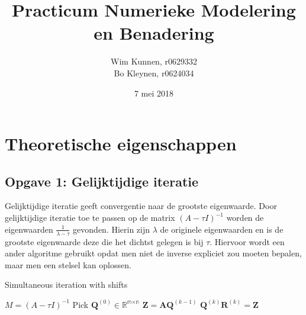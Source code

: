 \documentclass[a4paper]{article}
\title{Practicum Numerieke Modelering en Benadering}
\author{Wim Kunnen, r0629332 \\ Bo Kleynen, r0624034}
\date{7 mei 2018}
\newcommand{\opgave}[1]{\subsection{Opgave #1}}
\begin{document}
\begin{titlepage}
\maketitle
\thispagestyle{empty}
\end{titlepage}


\setcounter{page}{1}
\tableofcontents
\cleardoublepage

\listoffigures
{}

\listoftables
{}

\listofalgorithms
{}

\cleardoublepage



\setcounter{page}{1}

\section{Theoretische eigenschappen}\label{sec:theorie}

\opgave{1: Gelijktijdige iteratie}\label{sec:oef1}

Gelijktijdige iteratie geeft convergentie naar de grootste eigenwaarde. Door gelijktijdige iteratie toe te passen op de matrix $(A-\tau I)^{-1}$ worden de eigenwaarden $\frac{1}{\lambda - \tau}$ gevonden. Hierin zijn $\lambda$ de originele eigenwaarden en is de grootste eigenwaarde deze die het dichtst gelegen is bij $\tau$. Hiervoor wordt een ander algoritme gebruikt opdat men niet de inverse expliciet zou moeten bepalen, maar men een stelsel kan oplossen.
\newline
\begin{algorithm}
\begin{algorithmic}[H]\label{alg:SI}\caption{Simultaneous iteration with shifts}
	\State $M = (A-\tau I)^{-1}$
	\State Pick $\textbf{\^{Q}}^{(0)} \in  \mathbb{R^{\text{m} \times \text{n}}}$
		\State $\textbf{Z} = \textbf{A}\textbf{\^{Q}}^{(k-1)}$
		\State$\textbf{\^{Q}}^{(k)}\textbf{\^{R}}^{(k)} = \textbf{Z}$
	\EndFor
\end{algorithmic}
\end{algorithm}
\end{document}
